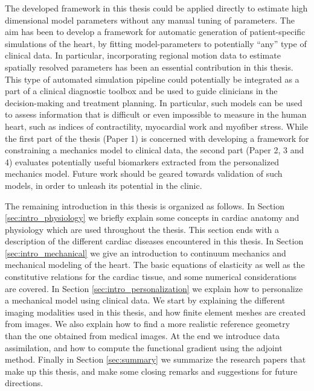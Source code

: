 The developed framework in this thesis could be applied directly to
estimate high dimensional model parameters without any manual tuning of
parameters. The aim has been to develop a framework for automatic
generation of patient-specific simulations of the heart, by fitting
model-parameters to potentially ``any'' type of clinical data. In particular,
incorporating regional motion data to estimate spatially resolved
parameters has been an essential contribution in this thesis. This
type of automated simulation pipeline could potentially be integrated
as a part of a clinical diagnostic toolbox and be used to guide clinicians in the
decision-making and treatment planning. In particular, such models can
be used to assess information that is difficult or even impossible to
measure in the human heart, such as indices of contractility,
myocardial work and myofiber stress. While the first part of the
thesis (Paper 1) is concerned with developing a framework for
constraining a mechanics model to clinical data, the second part
(Paper 2, 3 and 4) evaluates potentially useful biomarkers extracted from
the personalized mechanics model. Future work should be geared towards
validation of such models, in order to unleash its potential in the
clinic.

The remaining introduction in this thesis is organized as follows. In
Section \ref{sec:intro_physiology} we briefly explain some concepts in
cardiac anatomy and physiology which are used throughout the
thesis. This section ends with a description of the different cardiac
diseases encountered in this thesis. In Section
\ref{sec:intro_mechanical} we give an introduction to continuum
mechanics and mechanical modeling of the heart. The basic equations of
elasticity as well as the constitutive relations for the cardiac
tissue, and some numerical considerations are covered. In Section 
\ref{sec:intro_personalization} we explain how to personalize a
mechanical model using clinical data. We start by explaining the
different imaging modalities used in this thesis, and how finite
element meshes are created from images. We also explain how to find a
more realistic reference geometry than the one obtained from medical
images. At the end we introduce data assimilation, and how to compute
the functional gradient using the adjoint method. Finally in Section
\ref{sec:summary} we summarize the research papers that make up this
thesis, and make some closing remarks and suggestions for future
directions. 

\newpage


